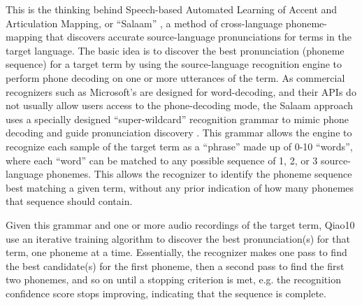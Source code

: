 \documentclass[11pt]{article}
\begin{document}
This is the thinking behind Speech-based Automated Learning of Accent and Articulation Mapping, or ``Salaam'' \cite{Sherwani09,Qiao10,Chan12}, a
method of cross-language phoneme-mapping 
that
discovers accurate source-language pronunciations for terms in the 
target language. 
The basic idea 
is to discover the best pronunciation (phoneme sequence) for a target term by using the source-language recognition engine to perform phone decoding on one or more utterances of the term. As commercial recognizers such as Microsoft's are designed for word-decoding, and their APIs do not usually allow users access to the phone-decoding mode, the Salaam approach uses a specially designed  ``super-wildcard'' recognition grammar 
to mimic phone decoding 
and guide pronunciation discovery \cite{Qiao10,Chan12}.
This grammar allows the engine to recognize each sample of the target term as a ``phrase'' made up of 0-10 ``words'',
where each ``word'' can be matched to any possible sequence of 1, 2, or 3 source-language phonemes.
This allows the recognizer to identify the phoneme sequence best matching a given term, without any prior indication of how many phonemes that sequence should contain.

Given this grammar and one or more audio recordings of the target term, 
\newcite
{Qiao10} 
use an iterative training algorithm to discover the best pronunciation(s) for that term, one phoneme at a time. 
Essentially, the recognizer makes one pass to find the best candidate(s) for the first phoneme, then a second pass to find the first two phonemes, and so on until a stopping criterion is met, e.g. the recognition confidence score 
stops improving, %
indicating that the sequence is complete.
\end{document}
